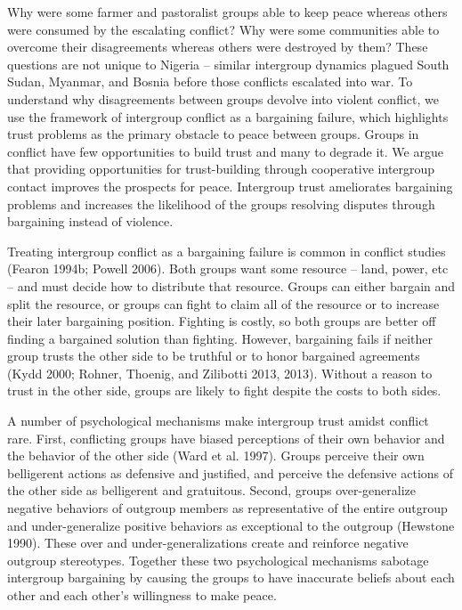 \documentclass[11pt]{article}
\begin{document}
Why were some farmer and pastoralist groups able to keep peace whereas
others were consumed by the escalating conflict? Why were some
communities able to overcome their disagreements whereas others were
destroyed by them? These questions are not unique to Nigeria -- similar
intergroup dynamics plagued South Sudan, Myanmar, and Bosnia before
those conflicts escalated into war. To understand why disagreements
between groups devolve into violent conflict, we use the framework of
intergroup conflict as a bargaining failure, which highlights trust
problems as the primary obstacle to peace between groups. Groups in
conflict have few opportunities to build trust and many to degrade it.
We argue that providing opportunities for trust-building through
cooperative intergroup contact improves the prospects for peace.
Intergroup trust ameliorates bargaining problems and increases the
likelihood of the groups resolving disputes through bargaining instead
of violence.

Treating intergroup conflict as a bargaining failure is common in
conflict studies (Fearon 1994b; Powell 2006). Both groups want some
resource -- land, power, etc -- and must decide how to distribute that
resource. Groups can either bargain and split the resource, or groups
can fight to claim all of the resource or to increase their later
bargaining position. Fighting is costly, so both groups are better off
finding a bargained solution than fighting. However, bargaining fails if
neither group trusts the other side to be truthful or to honor bargained
agreements (Kydd 2000; Rohner, Thoenig, and Zilibotti 2013, 2013).
Without a reason to trust in the other side, groups are likely to fight
despite the costs to both sides.

A number of psychological mechanisms make intergroup trust amidst
conflict rare. First, conflicting groups have biased perceptions of
their own behavior and the behavior of the other side (Ward et al.
1997). Groups perceive their own belligerent actions as defensive and
justified, and perceive the defensive actions of the other side as
belligerent and gratuitous. Second, groups over-generalize negative
behaviors of outgroup members as representative of the entire outgroup
and under-generalize positive behaviors as exceptional to the outgroup
(Hewstone 1990). These over and under-generalizations create and
reinforce negative outgroup stereotypes. Together these two
psychological mechanisms sabotage intergroup bargaining by causing the
groups to have inaccurate beliefs about each other and each other's
willingness to make peace.
\end{document}
